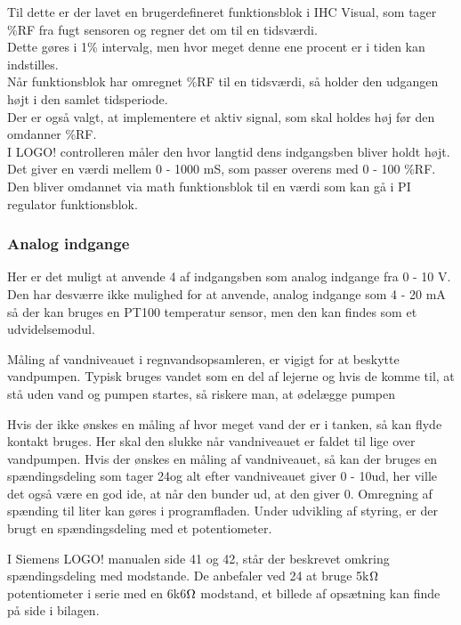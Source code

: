 Til dette er der lavet en brugerdefineret funktionsblok i IHC Visual, 
som tager \%RF fra fugt sensoren og regner det om til en tidsværdi. \\ 
Dette gøres i 1\% intervalg, men hvor meget denne ene procent er i tiden kan indstilles. \\
Når funktionsblok har omregnet \%RF til en tidsværdi, så holder den udgangen højt i den samlet tidsperiode. \\
Der er også valgt, at implementere et aktiv signal, som skal holdes høj før den omdanner \%RF.\\

I LOGO! controlleren måler den hvor langtid dens indgangsben bliver holdt højt.
Det giver en værdi mellem 0 - 1000 mS, som passer overens med 0 - 100 \%RF. Den bliver omdannet via math funktionsblok til en værdi som kan gå i PI regulator funktionsblok.

\subsubsection{Analog indgange}
Her er det muligt at anvende 4 af indgangsben som analog indgange fra 0 - 10 V.
Den har desværre ikke mulighed for at anvende, 
analog indgange som 4 - 20 mA så der kan bruges en PT100 temperatur sensor,
men den kan findes som et udvidelsemodul.

Måling af vandniveauet i regnvandsopsamleren, er vigigt for at beskytte vandpumpen. 
Typisk bruges vandet som en del af lejerne og hvis de komme til, 
at stå uden vand og pumpen startes, 
så riskere man, at ødelægge pumpen

Hvis der ikke ønskes en måling af hvor meget vand der er i tanken, så kan flyde kontakt bruges.
Her skal den slukke når vandniveauet er faldet til lige over vandpumpen.
Hvis der ønskes en måling af vandniveauet, så kan der bruges en spændingsdeling som tager 24\vdc og alt efter vandniveauet giver 0 - 10\vdc ud,
her ville det også være en god ide, at når den bunder ud, at den giver 0\vdc. Omregning af spænding til liter kan gøres i programfladen. 
Under udvikling af styring, er der brugt en spændingsdeling med et potentiometer.

I Siemens LOGO! manualen side 41 og 42, står der beskrevet omkring spændingsdeling med modstande. 
De anbefaler ved 24 \vdc at bruge 5k$\ohm$ potentiometer i serie med en 6k6$\ohm$ modstand, 
et billede af opsætning kan finde på side \pageref{man:logo_side_42} i bilagen.

